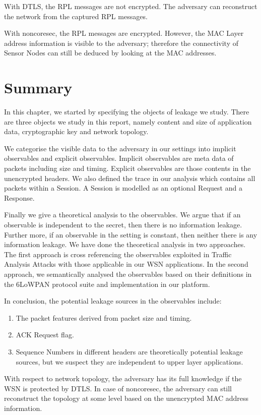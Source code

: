 \begin{description}[style=nextline]
	\item With DTLS, the RPL messages are not encrypted. The adversary can reconstruct the network from the captured RPL messages.
	\item With noncoresec, the RPL messages are encrypted. However, the MAC Layer address information is visible to the adversary; therefore the connectivity of Sensor Nodes can still be deduced by looking at the MAC addresses.
\end{description}

\section{Summary}

In this chapter, we started by specifying the objects of leakage we study. There are three objects we study in this report, namely content and size of application data, cryptographic key and network topology.

We categorise the visible data to the adversary in our settings into implicit observables and explicit observables. Implicit observables are meta data of packets including size and timing. Explicit observables are those contents in the unencrypted headers. We also defined the trace in our analysis which contains all packets within a Session. A Session is modelled as an optional Request and a Response.

Finally we give a theoretical analysis to the observables. We argue that if an observable is independent to the secret, then there is no information leakage. Further more, if an observable in the setting is constant, then neither there is any information leakage. We have done the theoretical analysis in two approaches. The first approach is cross referencing the observables exploited in Traffic Analysis Attacks with those applicable in our WSN applications. In the second approach, we semantically analysed the observables based on their definitions in the 6LoWPAN protocol suite and implementation in our platform. 

In conclusion, the potential leakage sources in the observables include:
\begin{enumerate}
	\item The packet features derived from packet size and timing.
	\item ACK Request flag.
	\item Sequence Numbers in different headers are theoretically potential leakage sources, but we suspect they are independent to upper layer applications.
\end{enumerate}

With respect to network topology, the adversary has its full knowledge if the WSN is protected by DTLS. In case of noncoresec, the adversary can still reconstruct the topology at some level based on the unencrypted MAC address information. 